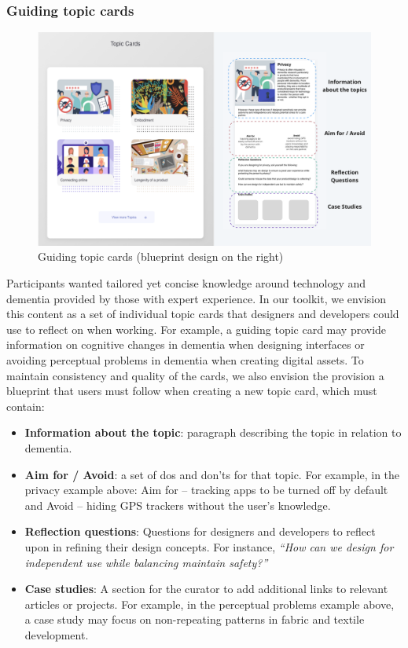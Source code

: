 \subsubsection{Guiding topic cards}
\begin{figure}[h]
\centering
\includegraphics[width=1\linewidth]{Images/D3Toolkit/Fig9.png}
\caption{Guiding topic cards (blueprint design on the right)}
\label{fig:topicCards}
\end{figure}
Participants wanted tailored yet concise knowledge around technology and dementia provided by those with expert experience. In our toolkit, we envision this content as a set of individual topic cards that designers and developers could use to reflect on when working. For example, a guiding topic card may provide information on cognitive changes in dementia when designing interfaces or avoiding perceptual problems in dementia when creating digital assets. To maintain consistency and quality of the cards, we also envision the provision a blueprint that users must follow when creating a new topic card, which must contain:
\begin{itemize}
    \item \textbf{Information about the topic}: paragraph describing the topic in relation to dementia.
    \item \textbf{Aim for / Avoid}: a set of dos and don’ts for that topic. For example, in the privacy example above: Aim for – tracking apps to be turned off by default and Avoid – hiding GPS trackers without the user’s knowledge. 
    \item \textbf{Reflection questions}: Questions for designers and developers to reflect upon in refining their design concepts. For instance,\textit{ “How can we design for independent use while balancing maintain safety?”}
    \item \textbf{Case studies}: A section for the curator to add additional links to relevant articles or projects. For example, in the perceptual problems example above, a case study may focus on non-repeating patterns in fabric and textile development.
\end{itemize}


